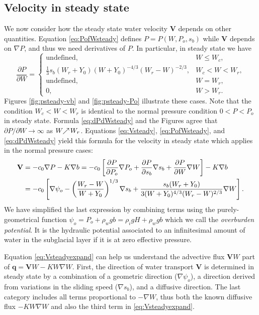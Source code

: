 \documentclass[11pt,final]{amsart}%
\newcommand\bV{\mathbf{V}}
\newcommand\bq{\mathbf{q}}
\newcommand{\grad}{\nabla}
\begin{document}
\subsection*{Velocity in steady state}  We now consider how the steady state water velocity $\bV$ depends on other quantities.  Equation \eqref{eq:PofWsteady} defines $P=P(W,P_o,s_b)$ while $\bV$ depends on $\grad P$, and thus we need derivatives of $P$.  In particular, in steady state we have
\begin{equation}
\frac{\partial P}{\partial W} =
    \begin{cases}
      \text{undefined}, & W \le W_c, \\
      \frac{1}{3} s_b (W_r + Y_0) (W+Y_0)^{-4/3} (W_r - W)^{-2/3}, & W_c < W < W_r, \\
      \text{undefined}, & W = W_r, \\
      0, & W > W_r.
    \end{cases}  \label{eq:dPdWsteady}
\end{equation}
Figures \ref{fig:psteady-vb} and \ref{fig:psteady-Po} illustrate these cases.  Note that the condition $W_c < W < W_r$ is identical to the normal pressure condition $0 < P < P_o$ in steady state.  Formula \eqref{eq:dPdWsteady} and the Figures agree that $\partial P / \partial W \to \infty$ as $W \!\!\nearrow\! W_r$.  Equations \eqref{eq:Vsteady}, \eqref{eq:PofWsteady}, and \eqref{eq:dPdWsteady} yield this formula for the velocity in steady state which applies in the normal pressure cases:
\begin{align}
\bV &= - c_0 \grad P - K \grad b = - c_0 \left[\frac{\partial P}{\partial P_o} \grad P_o + \frac{\partial P}{\partial s_b} \grad s_b + \frac{\partial P}{\partial W} \grad W\right] - K \grad b  \notag \\
    &= - c_0 \left[\grad \psi_o - \left(\frac{W_r - W}{W+Y_0}\right)^{1/3} \grad s_b + \frac{s_b (W_r + Y_0)}{3  (W+Y_0)^{4/3} (W_r - W)^{2/3}} \grad W\right]. \label{eq:Vsteadyexpand}
\end{align}
We have simplified the last expression by combining terms using the purely-geometrical function $\psi_o = P_o + \rho_w g b = \rho_i g H + \rho_w g b$ which we call the \emph{overburden potential}.  It is the hydraulic potential associated to an infinitesimal amount of water in the subglacial layer if it is at zero effective pressure.

Equation \eqref{eq:Vsteadyexpand} can help us understand the advective flux $\bV W$ part of $\bq=\bV W - K W \grad W$.  First, the direction of water transport $\bV$ is determined in steady state by a combination of a geometric direction ($\grad \psi_o$), a direction derived from variations in the sliding speed ($\grad s_b$), and a diffusive direction.  The last category includes all terms proportional to $-\grad W$, thus both the known diffusive flux $-K W \grad W$ and also the third term in \eqref{eq:Vsteadyexpand}.
\end{document}
